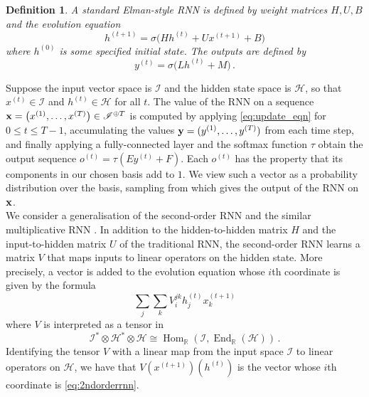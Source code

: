 \documentclass[english,letter paper,12pt,leqno]{article}
\theoremstyle{example}
\newtheorem{definition}[theorem]{Definition}
\numberwithin{equation}{section}
\def\Hom{\operatorname{Hom}}
\def\be{\begin{equation}}
\def\ee{\end{equation}}
\DeclareMathOperator{\End}{End}
\begin{document}
\begin{definition} A standard Elman-style RNN \cite{elman} is defined by weight matrices $H, U, B$ and the evolution equation
\be\label{eq:update_eqn}
h^{(t+1)} = \sigma\big( H h^{(t)} + U x^{(t+1)} + B\big)
\ee
where $h^{(0)}$ is some specified initial state. The outputs are defined by
\be\label{eq:output_rnn}
y^{(t)} = \sigma\big( L h^{(t)} + M \big)\,.
\ee
\end{definition}
Suppose the input vector space is $\mathscr{I}$ and the hidden state space is $\mathscr{H}$, so that $x^{(t)} \in \mathscr{I}$ and $h^{(t)} \in \mathscr{H}$ for all $t$. The value of the RNN on a sequence $\bold{x} = \big( x^{(1)}, \ldots, x^{(T)} \big) \in \mathscr{I}^{\oplus T}$ is computed by applying \eqref{eq:update_eqn} for $0 \le t \le T - 1$, accumulating the values $\bold{y} = (y^{(1)}, \ldots, y^{(T)})$ from each time step, and finally applying a fully-connected layer and the softmax function $\tau$ obtain the output sequence $o^{(t)} = \tau( E y^{(t)} + F )$. Each $o^{(t)}$ has the property that its components in our chosen basis add to $1$. We view such a vector as a probability distribution over the basis, sampling from which gives the output of the RNN on $\bold{x}$.
\\

We consider a generalisation of the second-order RNN \cite{highorderrec,pollack,firstvsecond,secondorder} and the similar multiplicative RNN \cite{sutskever}. In addition to the hidden-to-hidden matrix $H$ and the input-to-hidden matrix $U$ of the traditional RNN, the second-order RNN learns a matrix $V$ that maps inputs to linear operators on the hidden state. More precisely, a vector is added to the evolution equation whose $i$th coordinate is given by the formula
\be\label{eq:2ndorderrnn}
\sum_j \sum_k V^{jk}_{i} h^{(t)}_j x^{(t+1)}_k
\ee
where $V$ is interpreted as a tensor in
\be\label{eq:input_to_operator}
\mathscr{I}^* \otimes \mathscr{H}^* \otimes \mathscr{H} \cong \Hom_{\mathbb{R}}(\mathscr{I} , \End_{\mathbb{R}}(\mathscr{H}))\,.
\ee
Identifying the tensor $V$ with a linear map from the input space $\mathscr{I}$ to linear operators on $\mathscr{H}$, we have that $V(x^{(t+1)})(h^{(t)})$ is the vector whose $i$th coordinate is \eqref{eq:2ndorderrnn}. 
\end{document}
